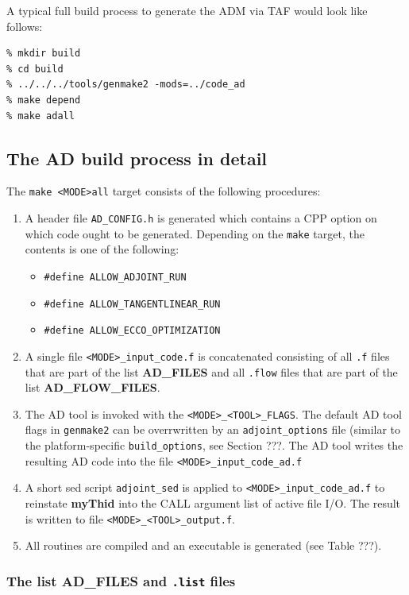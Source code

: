 A typical full build process to generate the ADM via TAF would
look like follows:
\begin{verbatim}
% mkdir build
% cd build
% ../../../tools/genmake2 -mods=../code_ad
% make depend
% make adall
\end{verbatim}


\subsection{The AD build process in detail
\label{section_ad_build_detail}}

The {\tt make <MODE>all} target consists of the following procedures:

\begin{enumerate}
%
\item
A header file {\tt AD\_CONFIG.h} is generated which contains a CPP option
on which code ought to be generated. Depending on the {\tt make} target,
the contents is one of the following:
\begin{itemize}
\item
{\tt \#define ALLOW\_ADJOINT\_RUN}
\item
{\tt \#define ALLOW\_TANGENTLINEAR\_RUN}
\item
{\tt \#define ALLOW\_ECCO\_OPTIMIZATION}
\end{itemize}
%
\item
A single file {\tt <MODE>\_input\_code.f} is concatenated 
consisting of all {\tt .f} files that are part of the list {\bf AD\_FILES} 
and all {\tt .flow} files that are part of the list {\bf AD\_FLOW\_FILES}.
%
\item
The AD tool is invoked with the {\tt <MODE>\_<TOOL>\_FLAGS}.
The default AD tool flags in {\tt genmake2} can be overrwritten by
an {\tt adjoint\_options} file (similar to the platform-specific
{\tt build\_options}, see Section ???.
The AD tool writes the resulting AD code into the file
{\tt <MODE>\_input\_code\_ad.f}
%
\item
A short sed script {\tt adjoint\_sed} is applied to 
{\tt <MODE>\_input\_code\_ad.f}
to reinstate {\bf myThid} into the CALL argument list of active file I/O.
The result is written to file {\tt <MODE>\_<TOOL>\_output.f}.
%
\item
All routines are compiled and an executable is generated
(see Table ???).
%
\end{enumerate}

\subsubsection{The list AD\_FILES and {\tt .list} files}

